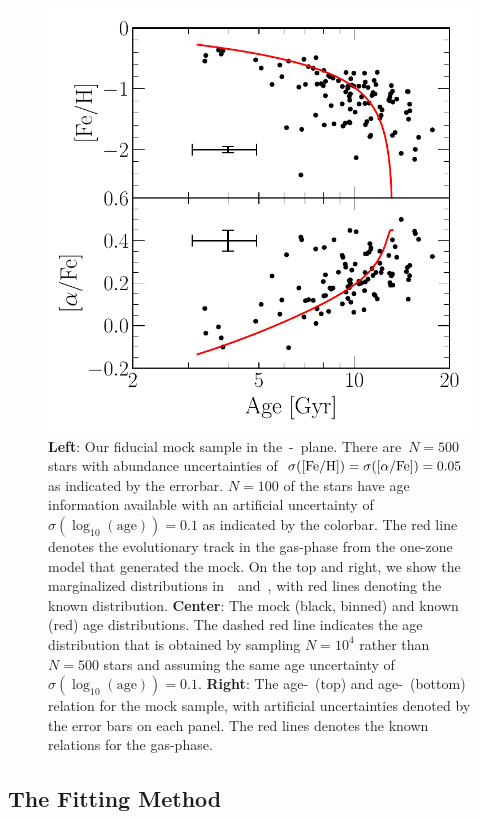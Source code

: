 \documentclass[ms.tex]{subfiles}
\begin{document}
\begin{figure}
\includegraphics[scale = 0.42]{fiducial_mock_amr.pdf}
\caption{
\textbf{Left}: Our fiducial mock sample in the~\afe-\feh~plane.
There are~$N = 500$ stars with abundance uncertainties
of~$\sigma(\text{[Fe/H]}) = \sigma(\text{[$\alpha$/Fe]}) = 0.05$ as indicated by the errorbar.
$N = 100$ of the stars have age information available with an artificial
uncertainty of~$\sigma(\log_{10}(\text{age})) = 0.1$ as indicated by the
colorbar.
The red line denotes the evolutionary track in the gas-phase from the one-zone
model that generated the mock.
On the top and right, we show the marginalized distributions
in~\afe~and~\feh, with red lines denoting the known distribution.
\textbf{Center}: The mock (black, binned) and known (red) age distributions.
The dashed red line indicates the age distribution that is obtained by sampling
$N = 10^4$ rather than $N = 500$ stars and assuming the same age uncertainty
of~$\sigma(\log_{10}(\text{age})) = 0.1$.
\textbf{Right}: The age-\feh~(top) and age-\afe~(bottom) relation for the mock
sample, with artificial uncertainties denoted by the error bars on each panel.
The red lines denotes the known relations for the gas-phase.
}
\label{fig:fiducialmock}
\end{figure}


\subsection{The Fitting Method}
\label{sec:methods:fitting}
\end{document}
